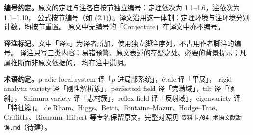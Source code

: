 \documentclass[UTF8, a4paper, 12pt, fontset=fandol, scheme=chinese]{ctexart}
\begin{document}
\textbf{编号约定。}原文的定理与注各自按节独立编号：定理依次为 1.1--1.6，注依次为 1.1--1.10，
公式按节编号（如 (2.1)）。译文沿用这一体制：定理环境与注环境分别计数，均按节重置。
原文中无编号的「Conjecture」在译文中亦不编号。

\textbf{译注标记。}文中「译\emph{n}」为译者所加，使用独立脚注序列，不占用作者脚注的编号。
译注只写三类内容：易错预警、原文表述的存疑之处、必要的背景提示；凡属推断而非原文依据的，
均在注中说明。

\textbf{术语约定。}p-adic local system 译「$p$ 进局部系统」，\'etale 译「平展」，
rigid analytic variety 译「刚性解析簇」，perfectoid field 译「完满域」，tilt 译「倾斜」，
Shimura variety 译「志村簇」，reflex field 译「反射域」，eigenvariety 译「特征簇」。
de Rham、Higgs、Betti、Fontaine--Mazur、Hodge--Tate、Griffiths、Riemann--Hilbert
等专名保留原文。完整对照见 \texttt{资料卡/04-术语文献勘误.md}（待建）。

\newpage
\tableofcontents
\newpage



{}

\end{document}
